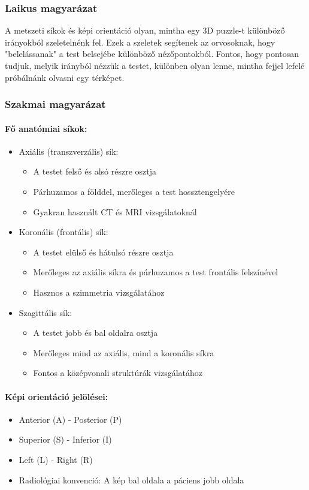 \documentclass[a4paper,12pt]{article}
\begin{document}
\subsubsection{Laikus magyarázat} A metszeti síkok és képi orientáció olyan, mintha egy 3D puzzle-t különböző irányokból szeletelnénk fel. Ezek a szeletek segítenek az orvosoknak, hogy "belelássanak" a test belsejébe különböző nézőpontokból. Fontos, hogy pontosan tudjuk, melyik irányból nézzük a testet, különben olyan lenne, mintha fejjel lefelé próbálnánk olvasni egy térképet.

\subsubsection{Szakmai magyarázat}

\paragraph{Fő anatómiai síkok:} \begin{itemize} \item Axiális (transzverzális) sík: \begin{itemize} \item A testet felső és alsó részre osztja \item Párhuzamos a földdel, merőleges a test hossztengelyére \item Gyakran használt CT és MRI vizsgálatoknál \end{itemize} \item Koronális (frontális) sík: \begin{itemize} \item A testet elülső és hátulsó részre osztja \item Merőleges az axiális síkra és párhuzamos a test frontális felszínével \item Hasznos a szimmetria vizsgálatához \end{itemize} \item Szagittális sík: \begin{itemize} \item A testet jobb és bal oldalra osztja \item Merőleges mind az axiális, mind a koronális síkra \item Fontos a középvonali struktúrák vizsgálatához \end{itemize} \end{itemize}

\paragraph{Képi orientáció jelölései:} \begin{itemize} \item Anterior (A) - Posterior (P) \item Superior (S) - Inferior (I) \item Left (L) - Right (R) \item Radiológiai konvenció: A kép bal oldala a páciens jobb oldala \end{itemize}
\end{document}
